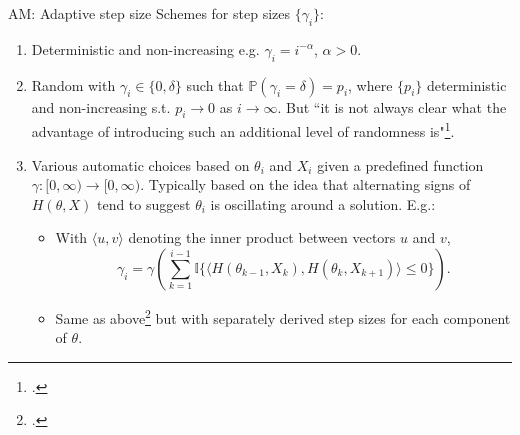 \documentclass[aspectratio=169]{beamer}
\begin{document}
\begin{frame}{AM: Adaptive step size}
    Schemes for step sizes $\{\gamma_i\}$:
    \begin{enumerate}
        \item Deterministic and non-increasing e.g. $\gamma_i = i^{-\alpha}$, $\alpha >0$.
        \pause

        \item Random with $\gamma_i \in \{0, \delta\}$ such that $\mathbb{P}(\gamma_i = \delta) = p_i$, where $\{p_i\}$ deterministic and non-increasing s.t. $p_i \to 0$ as $i \to \infty$. 
        \pause 
        But ``it is not always clear what the advantage of introducing such an additional level of randomness is"\footcite{andrieu_tutorial_2008}.
        \onslide<+-> 

        \item Various automatic choices based on $\theta_i$ and $X_i$ given a predefined function $\gamma: [0, \infty) \to [0, \infty)$.
        Typically based on the idea that alternating signs of $H(\theta, X)$ tend to suggest $\theta_i$ is oscillating around a solution.
        E.g.:
        \pause
        \begin{itemize}%
            
            \item With $\langle u, v \rangle$ denoting the inner product between vectors $u$ and $v$,
            $$\gamma_i = \gamma \left(\sum_{k=1}^{i-1} \mathbb{I}\{\langle H(\theta_{k-1}, X_k), H(\theta_{k}, X_{k+1}) \rangle \leq 0\}\right).$$
            \pause 

            \item Same as above\footcite{delyon_accelerated_1993} but with separately derived step sizes for each component of $\theta$.
        \end{itemize}
    \end{enumerate}

\end{frame}
\end{document}
